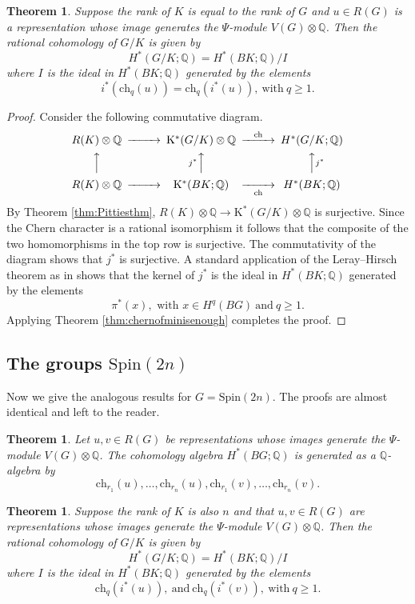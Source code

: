 \documentclass[twoside,a4paper,reqno,11pt]{amsart}
\newtheorem{theorem}[lemma]{Theorem}
\newcommand{\K}{\mathrm{K}}
\newcommand{\Q}{\mathbb{Q}}
\renewcommand{\o}{\otimes}
\newcommand{\Spin}{\mathrm{Spin}}
\newcommand{\ch}{\mathrm{ch}}
\begin{document}
\begin{theorem} \label{thm:BorelandPittie}
Suppose the rank of $K$ is equal to the rank of $G$ and $u \in R(G)$ is a representation whose image generates the $\Psi$-module $V(G)\o\Q$.  Then the rational cohomology of $G/K$ is given by 
$$
H^*(G/K; \Q) = H^*(BK; \Q)/I
$$
where $I$ is the ideal in $H^*(BK; \Q)$ generated by the elements
$$
i^*(\ch_q(u)) = \ch_q(i^*(u)), \mathrm{\ with \ } q \geq 1.
$$
\end{theorem}

\begin{proof}
Consider the following commutative diagram.
$$
\begin{CD}
R(K) \otimes\Q @>>> \K^*(G/K) \otimes \Q @>{\ch}>> H^*(G/K; \Q) \\
@AAA @A{j^*}AA @AAj^*A \\
R(K) \otimes\Q @>>> \K^*(BK; \Q) @>>{\ch}> H^*(BK; \Q)
\end{CD}
$$
By Theorem \ref{thm:Pittiesthm}, $R(K) \otimes \Q \to \K^*(G/K) \otimes \Q$ is surjective. Since the Chern character is a rational isomorphism it follows that the composite of the two homomorphisms in the top row is surjective. The commutativity of the diagram shows that $j^*$ is surjective. A standard application of the Leray--Hirsch theorem as in \cite[Section~26]{MR0051508} shows that the kernel of $j^*$ is the ideal in $H^*(BK; \Q)$ generated by the elements
$$
\pi^*(x), \text{ with } x \in H^q(BG) \mathrm{\ and \ }  q \geq 1.
$$
Applying Theorem \ref{thm:chernofminisenough} completes the proof. 
\end{proof}

\subsection{The groups $\Spin(2n)$} \label{sec:spin2nagain}

Now we give the analogous results for $G = \Spin(2n)$. The proofs are almost identical and left to the reader.  

\begin{theorem} \label{thm:chernofminisenoughSpin}
Let $u, v \in R(G)$ be representations whose images generate the $\Psi$-module $V(G)\o\Q$. The cohomology algebra $H^*(BG; \Q)$ is generated as a $\Q$-algebra by
\[ \ch_{r_1}(u), \ldots, \ch_{r_n}(u),  \ch_{r_1}(v), \ldots, \ch_{r_n}(v).\]
\end{theorem}



\begin{theorem} \label{thm:BorelandPittieSpin}
Suppose the rank of $K$ is also $n$ and that $u,v \in R(G)$ are representations whose images generate the $\Psi$-module $V(G)\o\Q$. Then the rational cohomology of $G/K$ is given by 
\[
H^*(G/K; \Q) = H^*(BK; \Q)/I
\]
where $I$ is the ideal in $H^*(BK; \Q)$ generated by the elements
\[
\ch_q(i^*(u)), \mathrm{\ and \ } \ch_q(i^*(v)), \mathrm{\ with \ } q \geq 1. \]
\end{theorem}
\end{document}
